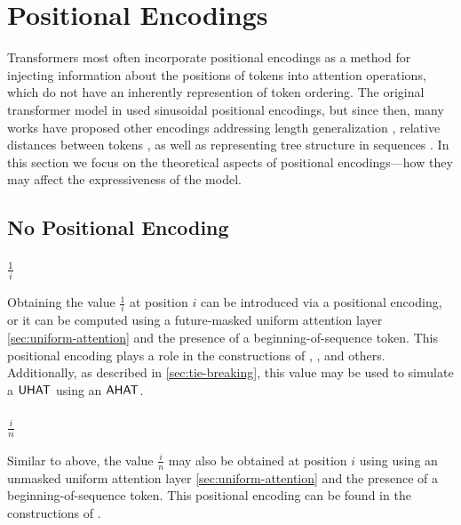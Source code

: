 %
\chapter{Positional Encodings}
%

Transformers most often incorporate positional encodings as a method for injecting information about the positions of tokens into attention operations, which do not have an inherently represention of token ordering. The original transformer model in \citet{vaswani-etal-2017-attention} used sinusoidal positional encodings, but since then, many works have proposed other encodings addressing length generalization \citep{kazemnejad2024impact}, relative distances between tokens \citep{shaw2018self}, as well as representing tree structure in sequences \citep{shiv2019}. In this section we focus on the theoretical aspects of positional encodings---how they may affect the expressiveness of the model.


\section{No Positional Encoding}

\subsection{$\frac{1}{i}$}

Obtaining the value $\frac{1}{i}$ at position $i$ can be introduced via a positional encoding, or it can be computed using a future-masked uniform attention layer \cref{sec:uniform-attention} and the presence of a beginning-of-sequence token.  This positional encoding plays a role in the constructions of \citet{barcelo-etal-2024-logical}, \citet{merrill-sabharwal-2024-cot}, and others. Additionally, as described in \cref{sec:tie-breaking}, this value may be used to simulate a $\textsf{UHAT}$ using an $\textsf{AHAT}$.



\subsection{$\frac{i}{n}$}
Similar to above, the value $\frac{i}{n}$ may also be obtained at position $i$ using using an unmasked uniform attention layer \cref{sec:uniform-attention} and the presence of a beginning-of-sequence token. This positional encoding can be found in the constructions of \cite{merrill2023parallelism,chiang-cholak-2022-parity,strobl2024transformers}.

